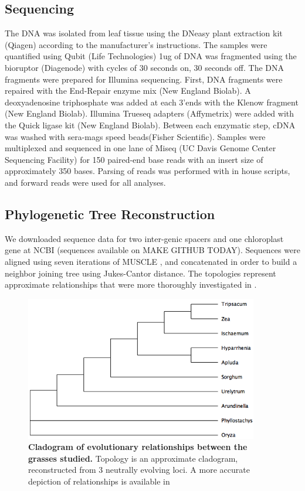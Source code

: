 \documentclass[10pt,letterpaper]{article}
\begin{document}
\subsection*{Sequencing}
The DNA was isolated from leaf tissue using the DNeasy plant extraction kit (Qiagen) according to the manufacturer’s instructions. 
The samples were quantified using Qubit (Life Technologies) 1ug of DNA was fragmented using the bioruptor (Diagenode) with cycles of 30 seconds on, 30 seconds off. 
The DNA fragments were prepared for Illumina sequencing. 
First, DNA fragments were repaired with the End-Repair enzyme mix (New England Biolab). 
A deoxyadenosine triphosphate was added at each 3'ends with the Klenow fragment (New England Biolab). 
Illumina Trueseq adapters (Affymetrix) were added with the Quick ligase kit (New England Biolab). 
Between each enzymatic step, cDNA was washed with sera-mags speed beads(Fisher Scientific).
Samples were multiplexed and sequenced in one lane of Miseq (UC Davis Genome Center Sequencing Facility) for 150 paired-end base reads with an insert size of approximately 350 bases.
Parsing of reads was performed with in house scripts, and forward reads were used for all analyses.

\subsection*{Phylogenetic Tree Reconstruction}
We downloaded sequence data for two inter-genic spacers and one chloroplast gene at NCBI (sequences available on MAKE GITHUB TODAY).
Sequences were aligned using seven iterations of MUSCLE \cite{edgar2004muscle}, and concatenated in order to build a neighbor joining tree using Jukes-Cantor distance.
The topologies represent approximate relationships that were more thoroughly investigated in \cite{wu2012phylogeny}.


\begin{figure}[h]
\begin{center}
\includegraphics[width=4in]{Phylotree_centrepeat.png}
\end{center}
\caption{{\bf Cladogram of evolutionary relationships between the grasses studied.}
Topology is an approximate cladogram, reconstructed from 3 neutrally evolving loci.
A more accurate depiction of relationships is available in \cite{wu2012phylogeny}}
\label{phylotree}
\end{figure}
\end{document}
